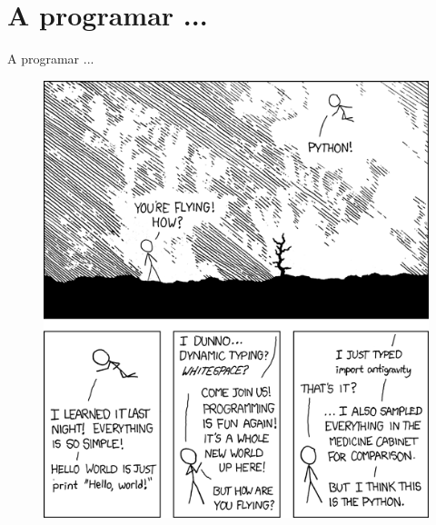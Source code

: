 \documentclass[xcolor=dvipsnames]{beamer}
\begin{document}
\section{A programar ...}
\begin{frame}{A programar ...}
 \begin{figure}[h]
		\includegraphics[scale = 0.25]{Imagenes/xkcd.png}
\end{figure}
\end{frame}
\end{document}
